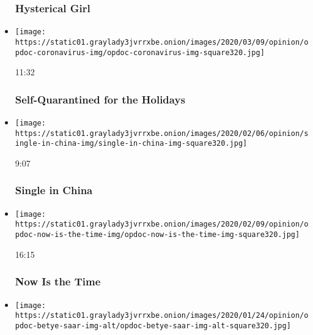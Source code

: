 \begin{itemize}
{  \subsubsection{Hysterical Girl}\label{hysterical-girl}}
\item
  \href{https://www.nytimes3xbfgragh.onion/video/opinion/100000007013675/self-quarantined-for-the-holidays.html?action=click\&module=video-series-bar\&region=header\&pgtype=Article\&playlistId=video/op-docs}{}

  \texttt{[image: https://static01.graylady3jvrrxbe.onion/images/2020/03/09/opinion/opdoc-coronavirus-img/opdoc-coronavirus-img-square320.jpg]}

  11:32

  \hypertarget{self-quarantined-for-the-holidays}{%
  \subsubsection{Self-Quarantined for the
  Holidays}\label{self-quarantined-for-the-holidays}}
\item
  \href{https://www.nytimes3xbfgragh.onion/video/opinion/100000006948977/single-in-china.html?action=click\&module=video-series-bar\&region=header\&pgtype=Article\&playlistId=video/op-docs}{}

  \texttt{[image: https://static01.graylady3jvrrxbe.onion/images/2020/02/06/opinion/single-in-china-img/single-in-china-img-square320.jpg]}

  9:07

  \hypertarget{single-in-china}{%
  \subsubsection{Single in China}\label{single-in-china}}
\item
  \href{https://www.nytimes3xbfgragh.onion/video/opinion/100000006946174/now-is-the-time.html?action=click\&module=video-series-bar\&region=header\&pgtype=Article\&playlistId=video/op-docs}{}

  \texttt{[image: https://static01.graylady3jvrrxbe.onion/images/2020/02/09/opinion/opdoc-now-is-the-time-img/opdoc-now-is-the-time-img-square320.jpg]}

  16:15

  \hypertarget{now-is-the-time}{%
  \subsubsection{Now Is the Time}\label{now-is-the-time}}
\item
  \texttt{[image: https://static01.graylady3jvrrxbe.onion/images/2020/01/24/opinion/opdoc-betye-saar-img-alt/opdoc-betye-saar-img-alt-square320.jpg]}


\end{itemize}
